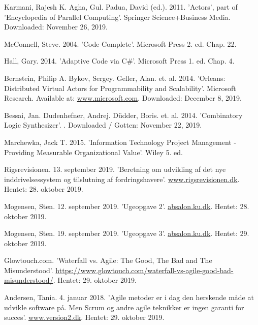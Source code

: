 \begin{thebibliography}{9}
Karmani, Rajesh K. Agha, Gul. Padua, David (ed.). 2011. 'Actors', part of 'Encyclopedia of Parallel Computing'. Springer Science+Business Media. Downloaded: November 26, 2019.

McConnell, Steve. 2004. 'Code Complete'. Microsoft Press 2. ed. Chap. 22.

Hall, Gary. 2014. 'Adaptive Code via C\#'. Microsoft Press 1. ed. Chap. 4.

Bernstein, Philip A. Bykov, Sergey. Geller, Alan. et. al. 2014. 'Orleans: Distributed Virtual Actors for Programmability and Scalability'. Microsoft Research. Available at: \url{www.microsoft.com}. Downloaded: December 8, 2019.

Bessai, Jan. Dudenhefner, Andrej. Düdder, Boris. et. al. 2014. 'Combinatory Logic Synthesizer'. . Downloaded / Gotten: November 22, 2019.

Marchewka, Jack T. 2015. 'Information Technology Project Management - Providing Measurable Organizational Value'. Wiley 5. ed.

Rigsrevisionen. 13. september 2019. 'Beretning om udvikling af det nye inddrivelsessystem og tilslutning af fordringshavere'. \url{www.rigsrevisionen.dk}. Hentet: 28. oktober 2019.

Mogensen, Sten. 12. september 2019. 'Ugeopgave 2'. \url{absalon.ku.dk}. Hentet: 28. oktober 2019.

Mogensen, Sten. 19. september 2019. 'Ugeopgave 3'. \url{absalon.ku.dk}. Hentet: 29. oktober 2019.

Glowtouch.com. 'Waterfall vs. Agile: The Good, The Bad and The Misunderstood'. \url{https://www.glowtouch.com/waterfall-vs-agile-good-bad-misunderstood/}. Hentet: 29. oktober 2019.

Andersen, Tania. 4. januar 2018. 'Agile metoder er i dag den herskende måde at udvikle software på. Men Scrum og andre agile teknikker er ingen garanti for succes'. \url{www.version2.dk}. Hentet: 29. oktober 2019.
\end{thebibliography}